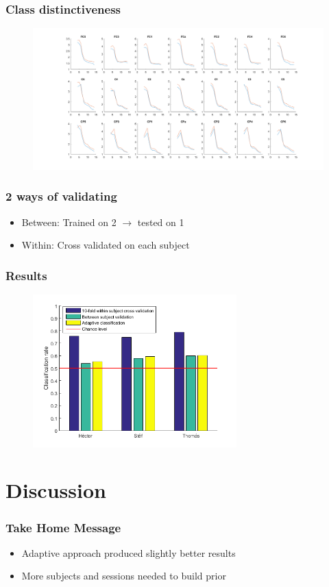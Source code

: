 \documentclass{beamer}
\begin{document}
\begin{frame}
  \frametitle{Class distinctiveness}

 \begin{figure}
  \centering
     \includegraphics[width=1.0\textwidth]{distinction.png}
 \end{figure}

\end{frame}

\begin{frame}

\frametitle{2 ways of validating}
 \begin{itemize}
   \item Between: Trained on 2 $\rightarrow$ tested on 1
   \item Within: Cross validated on each subject
 \end{itemize}

\end{frame}

\begin{frame}
  \frametitle{Results}

 \begin{figure}
  \centering
     \includegraphics[width=0.7\textwidth]{bars.png}
 \end{figure}

\end{frame}

\section{Discussion}
\begin{frame}

\frametitle{Take Home Message}
  \begin{itemize}
   \item Adaptive approach produced slightly better results
   \item More subjects and sessions needed to build prior
  \end{itemize}
\end{frame}
\end{document}
